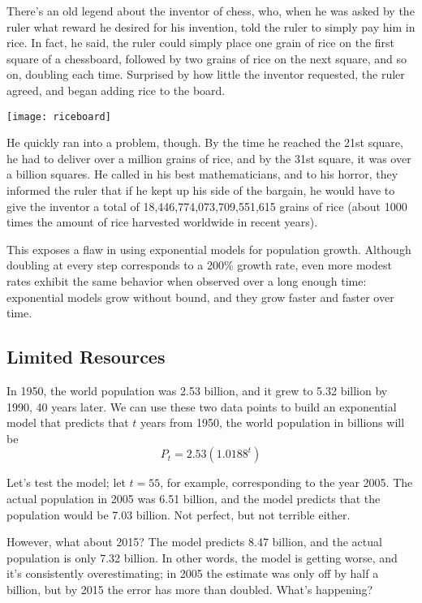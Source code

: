 \setcounter{ExampleCounter}{1}
There's an old legend about the inventor of chess, who, when he was asked by the ruler what reward he desired for his invention, told the ruler to simply pay him in rice.  In fact, he said, the ruler could simply place one grain of rice on the first square of a chessboard, followed by two grains of rice on the next square, and so on, doubling each time.  Surprised by how little the inventor requested, the ruler agreed, and began adding rice to the board.

\begin{center}
\texttt{[image: riceboard]}
\end{center}

He quickly ran into a problem, though.  By the time he reached the 21st square, he had to deliver over a million grains of rice, and by the 31st square, it was over a billion squares.  He called in his best mathematicians, and to his horror, they informed the ruler that if he kept up his side of the bargain, he would have to give the inventor a total of 18,446,774,073,709,551,615 grains of rice (about 1000 times the amount of rice harvested worldwide in recent years).

This exposes a flaw in using exponential models for population growth.  Although doubling at every step corresponds to a 200\% growth rate, even more modest rates exhibit the same behavior when observed over a long enough time: exponential models grow without bound, and they grow faster and faster over time.

\subsection{Limited Resources}
In 1950, the world population was 2.53 billion, and it grew to 5.32 billion by 1990, 40 years later.  We can use these two data points to build an exponential model that predicts that $t$ years from 1950, the world population in billions will be \[P_t = 2.53(1.0188^t)\]

Let's test the model; let $t=55$, for example, corresponding to the year 2005.  The actual population in 2005 was 6.51 billion, and the model predicts that the population would be 7.03 billion.  Not perfect, but not terrible either.

However, what about 2015?  The model predicts 8.47 billion, and the actual population is only 7.32 billion.  In other words, the model is getting worse, and it's consistently overestimating; in 2005 the estimate was only off by half a billion, but by 2015 the error has more than doubled.  What's happening?

